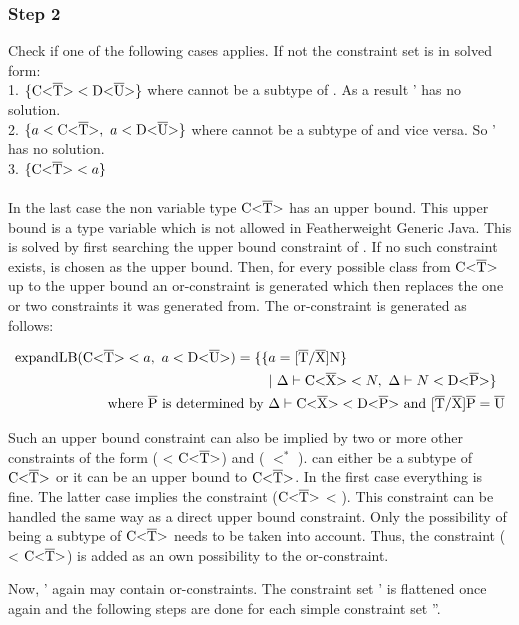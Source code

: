 \subsubsection{Step 2}
Check if one of the following cases applies. If not the constraint set is in solved form:\\
1. $\{ \text{C<}\overline{\text{T}}\text{>} < \text{D<}\overline{\text{U}}\text{>} \}$ where  cannot be a subtype of . As a result ' has no solution.\\
2. $\{ a < \text{C<}\overline{\text{T}}\text{>}, \ a < \text{D<}\overline{\text{U}}\text{>} \}$ where  cannot be a subtype of  and vice versa. So ' has no solution.\\
3. $\{ \text{C<}\overline{\text{T}}\text{>} < a \}$\\
\\
In the last case the non variable type $\text{C<}\overline{\text{T}}\text{>}$ has an upper bound. This upper bound is a type variable  which is not allowed in Featherweight Generic Java.
This is solved by first searching the upper bound constraint of . If no such constraint exists,  is chosen as the upper bound. Then, for every possible class
from $\text{C<}\overline{\text{T}}\text{>}$ up to the upper bound an or-constraint is generated which then replaces the one or two constraints it was generated from.
The or-constraint is generated as follows:

\begin{align*}
    \text{expandLB} ( \text{C<}\overline{\text{T}}\text{>} < a, \ a < \text{D<}\overline{\text{U}}\text{>} ) = \{ \{ &a = \text{[}\overline{\text{T}}/\overline{\text{X}}\text{]N} \} \\
     &| \ \Delta \vdash \text{C<}\overline{\text{X}}\text{>} < N, \ \Delta \vdash N < \text{D<}\overline{\text{P}}\text{>} \}\\
    \text{where} \ \overline{\text{P}} \ \text{is determined by } & \Delta \vdash \text{C<}\overline{\text{X}}\text{>} < \text{D<}\overline{\text{P}}\text{>} \ \text{and} \ \text{[}\overline{\text{T}}/\overline{\text{X}}\text{]}\overline{\text{P}} = \overline{\text{U}}\\
\end{align*}

Such an upper bound constraint can also be implied by two or more other constraints of the form ( < $\text{C<}\overline{\text{T}}\text{>}$) and ( $<^*$ ).  can either be a subtype of $\text{C<}\overline{\text{T}}\text{>}$ or it can be an upper bound to $\text{C<}\overline{\text{T}}\text{>}$. In the first case everything is fine.
The latter case implies the constraint ($\text{C<}\overline{\text{T}}\text{>}$ < ). This constraint can be handled the same way as a direct upper bound constraint. Only the possibility of  being a subtype of $\text{C<}\overline{\text{T}}\text{>}$ needs to be taken into account. Thus, the constraint ( < $\text{C<}\overline{\text{T}}\text{>}$) is added as an own possibility to the or-constraint.

Now, ' again may contain or-constraints. The constraint set ' is flattened once again and the following steps are done for each simple constraint set ''.

